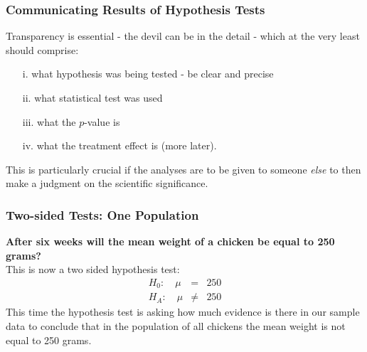 \documentclass{beamer}\usepackage[]{graphicx}\usepackage[]{color}
\makeatletter
\newcommand{\hlnum}[1]{\textcolor[rgb]{0.686,0.059,0.569}{#1}}%
\newcommand{\hlopt}[1]{\textcolor[rgb]{0,0,0}{#1}}%
\newcommand{\hlstd}[1]{\textcolor[rgb]{0.345,0.345,0.345}{#1}}%
\newcommand{\hlkwc}[1]{\textcolor[rgb]{0.333,0.667,0.333}{#1}}%
\newcommand{\hlkwd}[1]{\textcolor[rgb]{0.737,0.353,0.396}{\textbf{#1}}}%
\newenvironment{kframe}{%
 \def\at@end@of@kframe{}%
 \ifinner\ifhmode%
  \def\at@end@of@kframe{\end{minipage}}%
  \begin{minipage}{\columnwidth}%
 \fi\fi%
 \def\FrameCommand##1{\hskip\@totalleftmargin \hskip-\fboxsep
 \colorbox{shadecolor}{##1}\hskip-\fboxsep
     \hskip-\linewidth \hskip-\@totalleftmargin \hskip\columnwidth}%
 \MakeFramed {\advance\hsize-\width
   \@totalleftmargin\z@ \linewidth\hsize
   \@setminipage}}%
 {\par\unskip\endMakeFramed%
 \at@end@of@kframe}
\newenvironment{knitrout}{}{} %
\makeatother
\begin{document}
{{{%

\begin{frame}
\frametitle{Communicating Results of Hypothesis Tests}
Transparency is essential - the devil can be in the detail - which at the very
least should comprise:
\begin{itemize}
\item[i.] what hypothesis was being tested - be clear and precise
\item[ii.] what statistical test was used
\item[iii.] what the $p$-value is
\item[iv.] what the treatment effect is (more later).
\end{itemize}
\vspace{0.2cm}
This is particularly crucial if the analyses are to be given to someone
\emph{else} to then make a judgment on the scientific significance.
\end{frame}


\begin{frame}
\frametitle{Two-sided Tests: One Population}
{\bfseries After six weeks will the mean weight of a chicken {\bfseries be equal}
to 250 grams?}\\
This is now a two sided hypothesis test:
\begin{eqnarray}
H_0:\quad \mu &=& 250 \nonumber \\
H_A:\quad \mu &\ne& 250 \nonumber
\end{eqnarray}
This time the hypothesis test is asking how much evidence is there in our sample
data to conclude that in the population of all chickens the mean weight is not
equal to 250 grams.
\end{frame}



}}}
\end{document}
